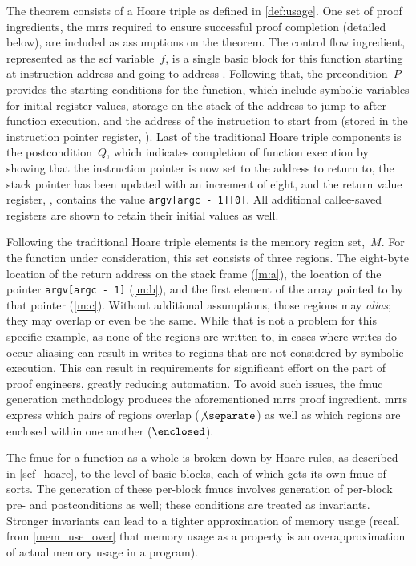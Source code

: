 The theorem consists of a Hoare triple as defined in \cref{def:usage}.
One set of proof ingredients,
the \acp{mrr} required to ensure successful proof completion (detailed below),
are included as assumptions on the theorem.
The control flow ingredient,
represented as the \ac{scf} variable~$f$, is a single basic block for this function
starting at instruction address  and going to address .
Following that,
the precondition~$P$ provides the starting conditions for the function,
which include symbolic variables for initial register values,
storage on the stack of the address to jump to after function execution,
and the address of the instruction to start from
(stored in the instruction pointer register, ).
Last of the traditional Hoare triple components is the postcondition~$Q$,
which indicates completion of function execution
by showing that the instruction pointer is now set to the address to return to,
the stack pointer  has been updated with an increment of eight,
and the return value register, ,
contains the value \lstinline|argv[argc - 1][0]|.
All additional callee-saved registers are shown to retain their initial values%
as well.

Following the traditional Hoare triple elements is the memory region set,~$M$.
For the function under consideration, this set consists of three regions.
The eight-byte location of the return address
on the stack frame (\cref{m:a}),
the location of the pointer \lstinline|argv[argc - 1]| (\cref{m:b}),
and the first element of the array pointed to by that pointer (\cref{m:c}).
Without additional assumptions, those regions may \emph{alias};
they may overlap or even be the same.
While that is not a problem for this specific example,
as none of the regions are written to, in cases where writes do occur
aliasing can result in writes to regions
that are not considered by symbolic execution.
This can result in requirements for significant effort on the part of proof engineers,
greatly reducing automation.
To avoid such issues, the \ac{fmuc} generation methodology
produces the aforementioned \acp{mrr} proof ingredient.%
\Acp{mrr} express which pairs of regions overlap ($\not\separate$)
as well as which regions are enclosed within one another ($\enclosed$).

The \ac{fmuc} for a function as a whole is broken down by Hoare rules,
as described in \cref{scf_hoare},
to the level of basic blocks, each of which gets its own \ac{fmuc} of sorts.
The generation of these per-block \acp{fmuc} involves generation of per-block
pre- and postconditions as well; these conditions are treated as invariants.
Stronger invariants can lead to a tighter approximation of memory usage
(recall from \cref{mem_use_over} that memory usage as a property
is an overapproximation of actual memory usage in a program).

